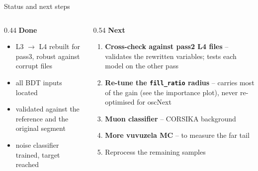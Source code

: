 \documentclass[aspectratio=169,10pt]{beamer}
\begin{document}
\begin{frame}{Status and next steps}
  \begin{columns}[T,onlytextwidth]
    \begin{column}{0.44\textwidth}
      \footnotesize
      \textbf{Done}
      \begin{itemize}\footnotesize
        \item L3 $\to$ L4 rebuilt for pass3, robust against corrupt files
        \item all BDT inputs located
        \item validated against the reference and the original segment
        \item noise classifier trained, target reached
      \end{itemize}
    \end{column}
    \begin{column}{0.54\textwidth}
      \footnotesize
      \textbf{Next}
      \begin{enumerate}\footnotesize
        \item \textbf{Cross-check against pass2 L4 files} -- validates the
              rewritten variables; tests each model on the other pass
        \item \textbf{Re-tune the \texttt{fill\_ratio} radius} -- carries most
              of the gain (see the importance plot), never re-optimised for
              oscNext
        \item \textbf{Muon classifier} -- CORSIKA background
        \item \textbf{More vuvuzela MC} -- to measure the far tail
        \item Reprocess the remaining samples
      \end{enumerate}
    \end{column}
  \end{columns}

\end{frame}
\end{document}
